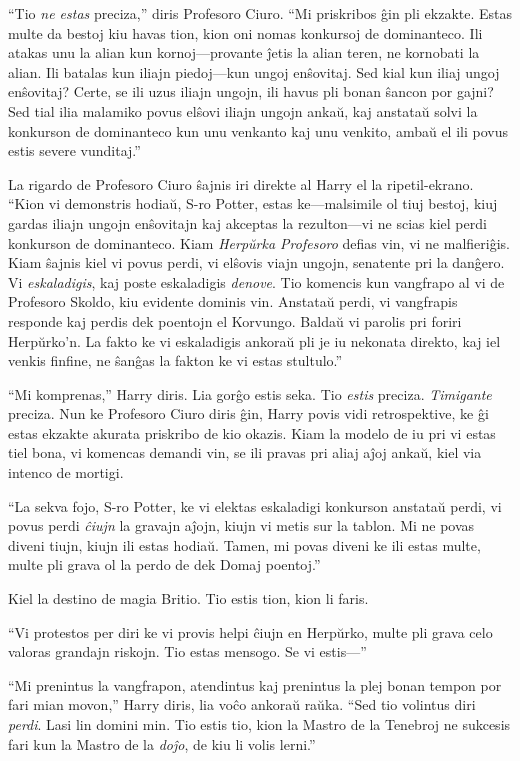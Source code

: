 ``Tio \emph{ne estas} preciza,'' diris Profesoro Ciuro. ``Mi
priskribos ĝin pli ekzakte. Estas multe da bestoj kiu havas tion, kion
oni nomas konkursoj de dominanteco. Ili atakas unu la alian kun
kornoj—provante ĵetis la alian teren, ne kornobati la alian.  Ili
batalas kun iliajn piedoj—kun ungoj enŝovitaj. Sed kial kun iliaj
ungoj enŝovitaj? Certe, se ili uzus iliajn ungojn, ili havus pli bonan
ŝancon por gajni? Sed tial ilia malamiko povus elŝovi iliajn ungojn
ankaŭ, kaj anstataŭ solvi la konkurson de dominanteco kun unu venkanto
kaj unu venkito, ambaŭ el ili povus estis severe vunditaj.''

La rigardo de Profesoro Ciuro ŝajnis iri direkte al Harry el la
ripetil-ekrano. ``Kion vi demonstris hodiaŭ, S-ro Potter, estas
ke—malsimile ol tiuj bestoj, kiuj gardas iliajn ungojn enŝovitajn kaj
akceptas la rezulton—vi ne scias kiel perdi konkurson de
dominanteco. Kiam \emph{Herpŭrka Profesoro} defias vin, vi ne
malfieriĝis. Kiam ŝajnis kiel vi povus perdi, vi elŝovis viajn ungojn,
senatente pri la danĝero. Vi \emph{eskaladigis}, kaj poste eskaladigis
\emph{denove}. Tio komencis kun vangfrapo al vi de Profesoro Skoldo,
kiu evidente dominis vin. Anstataŭ perdi, vi vangfrapis responde kaj
perdis dek poentojn el Korvungo. Baldaŭ vi parolis pri foriri
Herpŭrko'n. La fakto ke vi eskaladigis ankoraŭ pli je iu nekonata
direkto, kaj iel venkis finfine, ne ŝanĝas la fakton ke vi estas
stultulo.''

``Mi komprenas,'' Harry diris. Lia gorĝo estis seka. Tio \emph{estis}
preciza. \emph{Timigante} preciza. Nun ke Profesoro Ciuro diris ĝin,
Harry povis vidi retrospektive, ke ĝi estas ekzakte akurata priskribo
de kio okazis. Kiam la modelo de iu pri vi estas tiel bona, vi
komencas demandi vin, se ili pravas pri aliaj aĵoj ankaŭ, kiel via
intenco de mortigi. 

``La sekva fojo, S-ro Potter, ke vi elektas eskaladigi konkurson
anstataŭ perdi, vi povus perdi \emph{ĉiujn} la gravajn aĵojn, kiujn vi
metis sur la tablon. Mi ne povas diveni tiujn, kiujn ili estas
hodiaŭ. Tamen, mi povas diveni ke ili estas multe, multe pli grava ol
la perdo de dek Domaj poentoj.''

Kiel la destino de magia Britio. Tio estis tion, kion li faris.

``Vi protestos per diri ke vi provis helpi ĉiujn en Herpŭrko, multe pli
grava celo valoras grandajn riskojn. Tio estas mensogo. Se vi estis—'' 

``Mi prenintus la vangfrapon, atendintus kaj prenintus la plej bonan tempon
por fari mian movon,'' Harry diris, lia voĉo ankoraŭ raŭka. ``Sed tio
volintus diri \emph{perdi}. Lasi lin domini min. Tio estis tio, kion
la Mastro de la Tenebroj ne sukcesis fari kun la Mastro de la
\emph{doĵo}, de kiu li volis lerni.''

